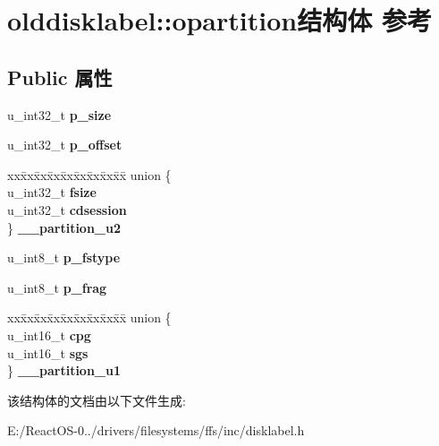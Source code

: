 \hypertarget{structolddisklabel_1_1opartition}{}\section{olddisklabel\+:\+:opartition结构体 参考}
\label{structolddisklabel_1_1opartition}
\subsection*{Public 属性}
\begin{DoxyCompactItemize}
\item 
\mbox{\label{structolddisklabel_1_1opartition_a20a25983db9c4f38a85593ddff38fc8a}} 
u\+\_\+int32\+\_\+t {\bfseries p\+\_\+size}
\item 
\mbox{\label{structolddisklabel_1_1opartition_a7e6231ab6d521c6966712569bcb6c84e}} 
u\+\_\+int32\+\_\+t {\bfseries p\+\_\+offset}
\item 
\mbox{\label{structolddisklabel_1_1opartition_a3bab95624665348c9de1eb92eb217c12}} 
\begin{tabbing}
xx\=xx\=xx\=xx\=xx\=xx\=xx\=xx\=xx\=\kill
union \{\\
\>u\_int32\_t {\bfseries fsize}\\
\>u\_int32\_t {\bfseries cdsession}\\
\} {\bfseries \_\_partition\_u2}\\

\end{tabbing}\item 
\mbox{\label{structolddisklabel_1_1opartition_af44ff325baed8bc2e2edc0f20c4654f3}} 
u\+\_\+int8\+\_\+t {\bfseries p\+\_\+fstype}
\item 
\mbox{\label{structolddisklabel_1_1opartition_a59ad45add18550e070dc5a5ce4891cc5}} 
u\+\_\+int8\+\_\+t {\bfseries p\+\_\+frag}
\item 
\mbox{\label{structolddisklabel_1_1opartition_a3d1297f4c5b8f54c881d612fc618bddd}} 
\begin{tabbing}
xx\=xx\=xx\=xx\=xx\=xx\=xx\=xx\=xx\=\kill
union \{\\
\>u\_int16\_t {\bfseries cpg}\\
\>u\_int16\_t {\bfseries sgs}\\
\} {\bfseries \_\_partition\_u1}\\

\end{tabbing}\end{DoxyCompactItemize}


该结构体的文档由以下文件生成\+:\begin{DoxyCompactItemize}
\item 
E\+:/\+React\+O\+S-\/0../drivers/filesystems/ffs/inc/disklabel.\+h\end{DoxyCompactItemize}
